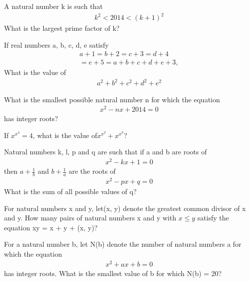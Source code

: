\item A natural number k is such that 
\begin{align*}
k^2 < 2014 < (k+1)^2
\end{align*}
What is the largest prime factor of k?

\item If real numbers a, b, c, d, e satisfy 
\begin{align*}
a + 1 = b + 2 = c + 3 = d + 4 \\= e + 5 = a + b + c + d + e + 3,
\end{align*}
What is the value of 
\begin{align*}
a^2 + b^2 + c^2 + d^2 + e^2
\end{align*}

\item What is the smallest possible natural number n for which the equation 
\begin{align*}
x^2 - nx + 2014 = 0
\end{align*}
has integer roots?

\item If $x^{x^{4}} = 4$, what is the value of$x^{x^{2}} + x^{x^{8}}$?

\item Natural numbers k, l, p and q are such that if a and b are roots of 
\begin{align*}
x^2 - kx + 1 = 0
\end{align*}
then $a + \frac{1}{b}$ and $b + \frac{1}{a}$ are the roots of 
\begin{align*}
x^2 - px + q = 0
\end{align*}
What is the sum of all possible values of q?

\item For natural numbers x and y, let(x, y) denote the greatest common divisor of x and y. How many pairs of natural numbers x and y with $x \leq y$ satisfy the equation xy = x + y + (x, y)?

\item For a natural number b, let N(b) denote the number of natural numbers a for which the equation 
\begin{align*}
x^2 + a x + b = 0
\end{align*}
has integer roots. What is the smallest value of b for which N(b) = 20?




